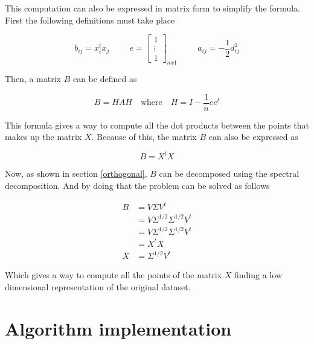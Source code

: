 \documentclass[12pt,journal]{IEEEtran}
\begin{document}
    This computation can also be expressed in matrix form to simplify the formula.
    First the following definitions must take place

    \[
        b_{ij} = x_i^t x_j
        \hspace{1cm}
        e =
        \begin{bmatrix}
            1\\
            \vdots\\
            1
        \end{bmatrix}_{nx1}
        \hspace{1cm}
        a_{ij} = -\frac{1}{2} d_{ij}^2
    \]

    Then, a matrix $B$ can be defined as

    \begin{equation*}
        B = H A H \quad \text{where} \quad H = I - \frac{1}{n} e e^t
    \end{equation*}

    This formula gives a way to compute all the dot products between the points
    that makes up the matrix $X$. Because of this, the matrix $B$ can also
    be expressed as

    \begin{equation*}
        B = X^tX
    \end{equation*}

    Now, as shown in section \ref{orthogonal}, $B$ can be decomposed using the
    spectral decomposition. And by doing that the problem can be solved as follows

    \begin{equation*}
        \begin{aligned}
            B &= V \Sigma V^t\\
              &= V \Sigma^{1/2} \Sigma^{1/2} V^t\\
              &= V \Sigma^{1/2} \Sigma^{1/2} V^t\\
              &= X^t X\\
            X & = \Sigma^{1/2} V^t
        \end{aligned}
    \end{equation*}

    Which gives a way to compute all the points of the matrix $X$ finding a low
    dimensional representation of the original dataset.

\section{Algorithm implementation}
\end{document}
